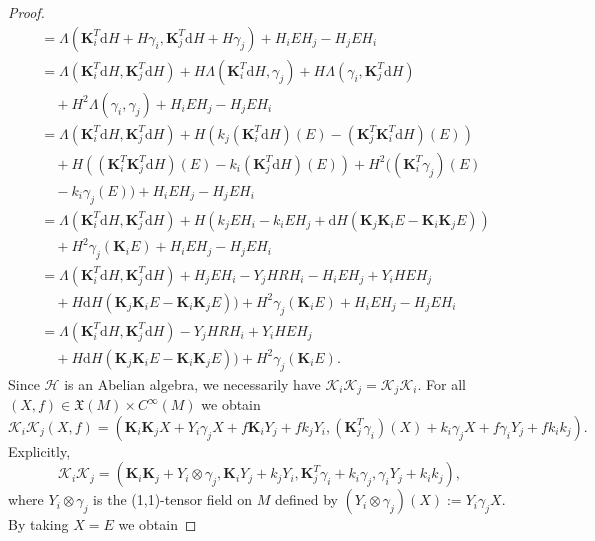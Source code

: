 \documentclass[10pt]{amsart}
\numberwithin{equation}{section}
\newcommand{\rd}{\mathrm{d}}
\newcommand{\bs}{\boldsymbol}
\theoremstyle{definition}
\begin{document}
\begin{proof}
\begin{equation}
\begin{split}
&=\Lambda(\bs{K}_{i}^{T}\rd H+H\gamma_{i},\bs{K}_{j}^{T}\rd H+H\gamma_{j})+H_{i}EH_{j}-H_{j}EH_{i}\\
&=\Lambda(\bs{K}_{i}^{T}\rd H,\bs{K}_{j}^{T}\rd H)+H\Lambda(\bs{K}_{i}^{T}\rd H,\gamma_{j})+H\Lambda(\gamma_{i},\bs{K}_{j}^{T}\rd H)\\
&\quad+H^{2}\Lambda(\gamma_{i},\gamma_{j})+H_{i}EH_{j}-H_{j}EH_{i}\\
&=\Lambda(\bs{K}_{i}^{T}\rd H,\bs{K}_{j}^{T}\rd H)+H(k_{j}(\bs{K}_{i}^{T}\rd H)(E)-(\bs{K}_{j}^{T}\bs{K}_{i}^{T}\rd H)(E))\\
&\quad+H((\bs{K}_{i}^{T}\bs{K}_{j}^{T}\rd H)(E)-k_{i}(\bs{K}_{j}^{T}\rd H)(E))+H^{2}((\bs{K}_{i}^{T}\gamma_{j})(E)\\
&\quad-k_{i}\gamma_{j}(E))+H_{i}EH_{j}-H_{j}EH_{i}\\
&=\Lambda(\bs{K}_{i}^{T}\rd H,\bs{K}_{j}^{T}\rd H)+H(k_{j}EH_{i}-k_{i}EH_{j}+\rd H(\bs{K}_{j}\bs{K}_{i}E-\bs{K}_{i}\bs{K}_{j}E))\\
&\quad+H^{2}\gamma_{j}(\bs{K}_{i}E)+H_{i}EH_{j}-H_{j}EH_{i}\\
&=\Lambda(\bs{K}_{i}^{T}\rd H,\bs{K}_{j}^{T}\rd H)+H_{j}EH_{i}-Y_{j}HRH_{i}-H_{i}EH_{j}+Y_{i}HEH_{j}\\
&\quad+H\rd H(\bs{K}_{j}\bs{K}_{i}E-\bs{K}_{i}\bs{K}_{j}E))+H^{2}\gamma_{j}(\bs{K}_{i}E)+H_{i}EH_{j}-H_{j}EH_{i}\\
&=\Lambda(\bs{K}_{i}^{T}\rd H,\bs{K}_{j}^{T}\rd H)-Y_{j}HRH_{i}+Y_{i}HEH_{j}\\
&\quad+H\rd H(\bs{K}_{j}\bs{K}_{i}E-\bs{K}_{i}\bs{K}_{j}E))+H^{2}\gamma_{j}(\bs{K}_{i}E).
\end{split}
\end{equation}
Since $\mathscr{H}$ is an Abelian algebra, we necessarily have $\bs{\mathcal{K}}_{i}\bs{\mathcal{K}}_{j}=\bs{\mathcal{K}}_{j}\bs{\mathcal{K}}_{i}$. For all $(X,f)\in\mathfrak{X}(M)\times C^{\infty}(M)$ we obtain
\begin{equation}
\bs{\mathcal{K}}_{i}\bs{\mathcal{K}}_{j}(X,f)=(\bs{K}_{i}\bs{K}_{j}X+Y_{i}\gamma_{j}X+f\bs{K}_{i}Y_{j}+fk_{j}Y_{i},(\bs{K}_{j}^{T}\gamma_{i})(X)+k_{i}\gamma_{j}X+f\gamma_{i}Y_{j}+fk_{i}k_{j}).
\end{equation}
Explicitly, 
\begin{equation}
\bs{\mathcal{K}}_{i}\bs{\mathcal{K}}_{j}=(\bs{K}_{i}\bs{K}_{j}+Y_{i}\otimes\gamma_{j},\bs{K}_{i}Y_{j}+k_{j}Y_{i},\bs{K}_{j}^{T}\gamma_{i}+k_{i}\gamma_{j},\gamma_{i}Y_{j}+k_{i}k_{j}),
\end{equation}
where $Y_{i}\otimes\gamma_{j}$ is the (1,1)-tensor field on $M$ defined by $(Y_{i}\otimes\gamma_{j})(X):=Y_{i}\gamma_{j}X$. By taking $X=E$ we obtain

\end{proof}
\end{document}

